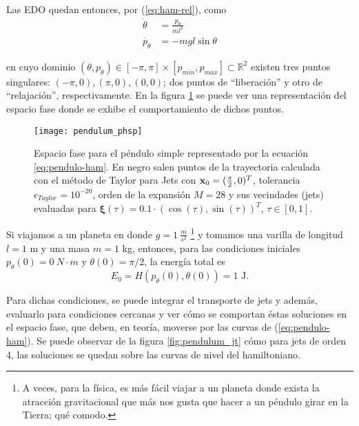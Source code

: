 Las EDO quedan entonces, por (\ref{eq:ham-rel}), como
\begin{align}
 \dot{\theta} &= \frac{p_{\theta}}{ml^2} \nonumber \\
 \dot{p_{\theta}} &= -mgl\sin{\theta} 
\label{eq:pendulo-ode}
\end{align}

en cuyo dominio $(\theta,p_{\theta}) \in [-\pi,\pi]\times[p_{min},p_{max}] \subset \mathbb{R}^2$ existen tres puntos singulares: $(-\pi,0),(\pi,0), (0,0)$; dos puntos de ``liberación'' y otro de ``relajación'', respectivamente. En la figura \ref{fig:pendulum_pshp} se puede ver una representación del espacio fase donde se exhibe el comportamiento de dichos puntos.

\begin{figure}[h!]
 \centering
 \texttt{[image: pendulum\_phsp]}
 \caption{Espacio fase para el péndulo simple representado por la ecuación \ref{eq:pendulo-ham}. En negro salen puntos de la trayectoria calculada con el método de Taylor para Jets con $\mathbf{x}_0 = (\frac{\pi}{2},0)^T$, tolerancia $\epsilon_{Taylor} = 10^{-20}$, orden de la expansión $M = 28$ y sus vecindades (jets) evaluadas para $\mathbf{\xi}(\tau) = 0.1\cdot \left( \cos(\tau), \sin(\tau) \right)^T$, $\tau \in [0,1]$.}
\label{fig:pendulum_pshp}
\end{figure}

Si viajamos a un planeta en donde $g = 1 \ \frac{m}{s^2}$ \footnote{A veces, para la física, es más fácil viajar a un planeta donde exista la atracción gravitacional que más nos gusta que hacer a un péndulo girar en la Tierra; qué comodo.} y tomamos una varilla de longitud $l=1$ m y una masa $m=1$ kg,  entonces, para las condiciones iniciales $p_{\theta}(0) = 0 \ N \cdot m$ y $\theta(0) = \pi/2$, la energía total es 
\begin{equation*}
E_0 = H(p_{\theta}(0),\theta (0) ) = 1 \text{ J.}
\end{equation*}

Para dichas condiciones, se puede integrar el transporte de jets y además, evaluarlo para condiciones cercanas y ver cómo se comportan éstas soluciones en el espacio fase, que deben, en teoría, moverse por las curvas de (\ref{eq:pendulo-ham}). Se puede observar de la figura \ref{fig:pendulum_jt} cómo para jets de orden 4, las soluciones se quedan sobre las curvas de nivel del hamiltoniano.

